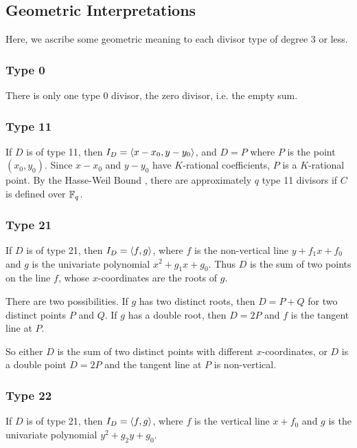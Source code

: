 
\subsection{Geometric Interpretations}

Here, we ascribe some geometric meaning to each divisor type of degree 3 or less.

\subsubsection{Type 0}
  There is only one type 0 divisor, the zero divisor, i.e. the empty sum.

\subsubsection{Type 11}
  If $D$ is of type 11, then $I_D = \left\langle x - x_0, y - y_0 \right\rangle$, and $D = P$ where $P$ is the point $(x_0, y_0)$.
  Since $x - x_0$ and $y - y_0$ have $K$-rational coefficients, $P$ is a $K$-rational point.
  By the Hasse-Weil Bound , there are approximately $q$ type 11 divisors if $C$ is defined over $\mathbb{F}_q$.

\subsubsection{Type 21}
  If $D$ is of type 21, then $I_D = \left\langle f, g \right\rangle$, where $f$ is the non-vertical line $y + f_1x + f_0$
  and $g$ is the univariate polynomial $x^2 + g_1x + g_0$.
  Thus $D$ is the sum of two points on the line $f$, whose $x$-coordinates are the roots of $g$.
  
  There are two possibilities.
  If $g$ has two distinct roots, then $D = P + Q$ for two distinct points $P$ and $Q$.
  If $g$ has a double root, then $D = 2P$ and $f$ is the tangent line at $P$.
  
  So either $D$ is the sum of two distinct points with different $x$-coordinates,
  or $D$ is a double point $D = 2P$ and the tangent line at $P$ is non-vertical.

\subsubsection{Type 22}
  If $D$ is of type 21, then $I_D = \left\langle f, g \right\rangle$, where $f$ is the vertical line $x + f_0$
  and $g$ is the univariate polynomial $y^2 + g_2y + g_0$.
  
